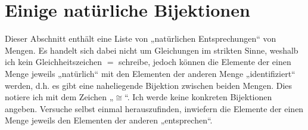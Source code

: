 \section{Einige natürliche Bijektionen} \label{anhang:natuerlichebijektionen}
Dieser Abschnitt enthält eine Liste von „natürlichen Entsprechungen“ von Mengen. Es handelt sich dabei nicht um Gleichungen im strikten Sinne, weshalb ich kein Gleichheitszeichen $=$ schreibe, jedoch können die Elemente der einen Menge jeweils „natürlich“ mit den Elementen der anderen Menge „identifiziert“ werden, d.h. es gibt eine naheliegende Bijektion zwischen beiden Mengen. Dies notiere ich mit dem Zeichen „$\cong$“. Ich werde keine konkreten Bijektionen angeben. Versuche selbst einmal herauszufinden, inwiefern die Elemente der einen Menge jeweils den Elementen der anderen „entsprechen“.


